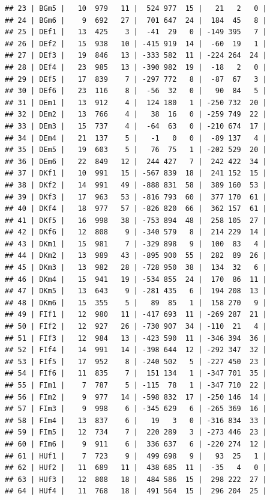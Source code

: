 \documentclass[
  finnish,
]{book}
\begin{document}
\begin{verbatim}
## 23 | BGm5 |   10  979   11 |  524 977  15 |   21   2   0 |
## 24 | BGm6 |    9  692   27 |  701 647  24 |  184  45   8 |
## 25 | DEf1 |   13  425    3 |  -41  29   0 | -149 395   7 |
## 26 | DEf2 |   15  938   10 | -415 919  14 |  -60  19   1 |
## 27 | DEf3 |   19  846   13 | -333 582  11 | -224 264  24 |
## 28 | DEf4 |   23  985   13 | -390 982  19 |  -18   2   0 |
## 29 | DEf5 |   17  839    7 | -297 772   8 |  -87  67   3 |
## 30 | DEf6 |   23  116    8 |  -56  32   0 |   90  84   5 |
## 31 | DEm1 |   13  912    4 |  124 180   1 | -250 732  20 |
## 32 | DEm2 |   13  766    4 |   38  16   0 | -259 749  22 |
## 33 | DEm3 |   15  737    4 |  -64  63   0 | -210 674  17 |
## 34 | DEm4 |   21  137    5 |   -1   0   0 |  -89 137   4 |
## 35 | DEm5 |   19  603    5 |   76  75   1 | -202 529  20 |
## 36 | DEm6 |   22  849   12 |  244 427   7 |  242 422  34 |
## 37 | DKf1 |   10  991   15 | -567 839  18 |  241 152  15 |
## 38 | DKf2 |   14  991   49 | -888 831  58 |  389 160  53 |
## 39 | DKf3 |   17  963   53 | -816 793  60 |  377 170  61 |
## 40 | DKf4 |   18  977   57 | -826 820  66 |  362 157  61 |
## 41 | DKf5 |   16  998   38 | -753 894  48 |  258 105  27 |
## 42 | DKf6 |   12  808    9 | -340 579   8 |  214 229  14 |
## 43 | DKm1 |   15  981    7 | -329 898   9 |  100  83   4 |
## 44 | DKm2 |   13  989   43 | -895 900  55 |  282  89  26 |
## 45 | DKm3 |   13  982   28 | -728 950  38 |  134  32   6 |
## 46 | DKm4 |   15  941   19 | -534 855  24 |  170  86  11 |
## 47 | DKm5 |   13  643    9 | -281 435   6 |  194 208  13 |
## 48 | DKm6 |   15  355    5 |   89  85   1 |  158 270   9 |
## 49 | FIf1 |   12  980   11 | -417 693  11 | -269 287  21 |
## 50 | FIf2 |   12  927   26 | -730 907  34 | -110  21   4 |
## 51 | FIf3 |   12  984   13 | -423 590  11 | -346 394  36 |
## 52 | FIf4 |   14  991   14 | -398 644  12 | -292 347  32 |
## 53 | FIf5 |   17  952    8 | -240 502   5 | -227 450  23 |
## 54 | FIf6 |   11  835    7 |  151 134   1 | -347 701  35 |
## 55 | FIm1 |    7  787    5 | -115  78   1 | -347 710  22 |
## 56 | FIm2 |    9  977   14 | -598 832  17 | -250 146  14 |
## 57 | FIm3 |    9  998    6 | -345 629   6 | -265 369  16 |
## 58 | FIm4 |   13  837    6 |   19   3   0 | -316 834  33 |
## 59 | FIm5 |   12  734    7 |  220 289   3 | -273 446  23 |
## 60 | FIm6 |    9  911    6 |  336 637   6 | -220 274  12 |
## 61 | HUf1 |    7  723    9 |  499 698   9 |   93  25   1 |
## 62 | HUf2 |   11  689   11 |  438 685  11 |  -35   4   0 |
## 63 | HUf3 |   12  808   18 |  484 586  15 |  298 222  27 |
## 64 | HUf4 |   11  768   18 |  491 564  15 |  296 204  25 |

\end{verbatim}
\end{document}
